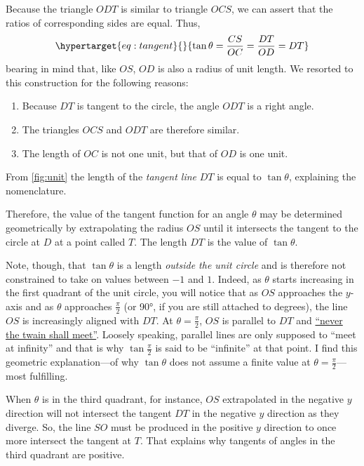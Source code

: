 \documentclass[
  a4paper,
]{article}
\providecommand{\tightlist}{%
  \setlength{\itemsep}{0pt}\setlength{\parskip}{0pt}}
\begin{document}
Because the triangle \(ODT\) is similar to triangle \(OCS\), we can
assert that the ratios of corresponding sides are equal. Thus,
\begin{equation}\protect\hypertarget{eq:tangent}{}{
\tan\theta = \frac{CS}{OC} = \frac{DT}{OD} = DT
}\label{eq:tangent}\end{equation} bearing in mind that, like \(OS\),
\(OD\) is also a radius of unit length. We resorted to this construction
for the following reasons:

\begin{enumerate}
\tightlist
\item
  Because \(DT\) is tangent to the circle, the angle \(ODT\) is a right
  angle.
\item
  The triangles \(OCS\) and \(ODT\) are therefore similar.
\item
  The length of \(OC\) is not one unit, but that of \(OD\) is one unit.
\end{enumerate}

From \cref{fig:unit} the length of the \emph{tangent line} \(DT\) is
equal to \(\tan\theta\), explaining the nomenclature.

Therefore, the value of the tangent function for an angle \(\theta\) may
be determined geometrically by extrapolating the radius \(OS\) until it
intersects the tangent to the circle at \(D\) at a point called \(T\).
The length \(DT\) is the value of \(\tan\theta\).

Note, though, that \(\tan\theta\) is a length \emph{outside the unit
circle} and is therefore not constrained to take on values between
\(-1\) and \(1\). Indeed, as \(\theta\) starts increasing in the first
quadrant of the unit circle, you will notice that as \(OS\) approaches
the \(y\)-axis and as \(\theta\) approaches \(\frac{\pi}{2}\) (or 90°,
if you are still attached to degrees), the line \(OS\) is increasingly
aligned with \(DT\). At \(\theta=\frac{\pi}{2}\), \(OS\) is parallel to
\(DT\) and
\href{https://en.wikipedia.org/wiki/The_Ballad_of_East_and_West}{``never
the twain shall meet''}. Loosely speaking, parallel lines are only
supposed to ``meet at infinity'' and that is why \(\tan\frac{\pi}{2}\)
is said to be ``infinite'' at that point. I find this geometric
explanation---of why \(\tan\theta\) does not assume a finite value at
\(\theta=\frac{\pi}{2}\)---most fulfilling.

When \(\theta\) is in the third quadrant, for instance, \(OS\)
extrapolated in the negative \(y\) direction will not intersect the
tangent \(DT\) in the negative \(y\) direction as they diverge. So, the
line \(SO\) must be produced in the positive \(y\) direction to once
more intersect the tangent at \(T\). That explains why tangents of
angles in the third quadrant are positive.
\end{document}
